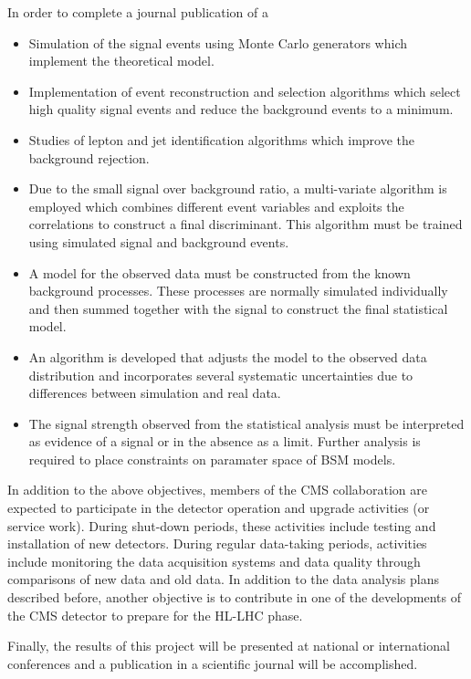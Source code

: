 \documentclass[final,3p]{CSP}
\begin{document}
In order to complete a journal publication of a  
\begin{itemize}
\item Simulation of the signal events using Monte Carlo generators which implement the theoretical model.
\item Implementation of event reconstruction and selection algorithms which select high quality signal events and reduce the background events to a minimum.
\item Studies of lepton and jet identification algorithms which improve the background rejection.
\item Due to the small signal over background ratio, a multi-variate algorithm is employed which combines different event variables and exploits the correlations to construct a final discriminant. This algorithm must be trained using simulated signal and background events.
\item A model for the observed data must be constructed from the known background processes. These processes are normally simulated individually and then summed together with the signal to construct the final statistical model.
\item An algorithm is developed that adjusts the model to the observed data distribution and incorporates several systematic uncertainties due to differences between simulation and real data.
\item The signal strength observed from the statistical analysis must be interpreted as evidence of a signal or in the absence as a limit. Further analysis is required to place constraints on paramater space of BSM models.
\end{itemize}

In addition to the above objectives, members of the CMS collaboration are expected to participate in the detector operation and upgrade activities (or service work).
During shut-down periods, these activities include testing and installation of new detectors.
During regular data-taking periods, activities include monitoring the data acquisition systems and data quality through comparisons of new data and old data.
In addition to the data analysis plans described before, another objective is to contribute in one of the developments of the CMS detector to  prepare for the HL-LHC phase.
%

Finally, the results of this project will be presented at national or international conferences and a publication in a scientific journal will be accomplished.
\end{document}
